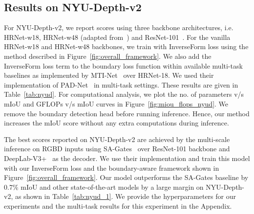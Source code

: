 \documentclass[final]{cvpr}
\begin{document}
\subsection{Results on NYU-Depth-v2}
For NYU-Depth-v2, we report scores using three backbone architectures, i.e. HRNet-w18, HRNet-w48 (adapted from~\cite{hrnet}) and ResNet-101~\cite{resnet}. For the vanilla HRNet-w18 and HRNet-w48 backbones, we train with InverseForm loss using the method described in Figure~\ref{fig:overall_framework}. We also add the InverseForm loss term to the boundary loss function within available multi-task baselines as implemented by MTI-Net~\cite{vandenhende2020mti} over HRNet-18. We used their implementation of PAD-Net~\cite{xu2018pad} in multi-task settings. These results are given in Table~\ref{tab:nyud}. For computational analysis, we plot the no. of parameters v/s mIoU and GFLOPs v/s mIoU curves in Figure~\ref{fig:miou_flops_nyud}. We remove the boundary detection head before running inference. Hence, our method increases the mIoU score without any extra computations during inference.  

The best scores reported on NYU-Depth-v2 are achieved by the multi-scale inference on RGBD inputs using SA-Gates~\cite{chen2020bidirectional} over ResNet-101 backbone and DeepLab-V3+~\cite{chen2017deeplab} as the decoder. We use their implementation and train this model with our InverseForm loss and the boundary-aware framework shown in Figure~\ref{fig:overall_framework}. Our model outperforms the SA-Gates baseline by 0.7\% mIoU and other state-of-the-art models by a large margin on NYU-Depth-v2, as shown in Table~\ref{tab:nyud_1}. We provide the hyperparameters for our experiments and the multi-task results for this experiment in the Appendix.
\end{document}
